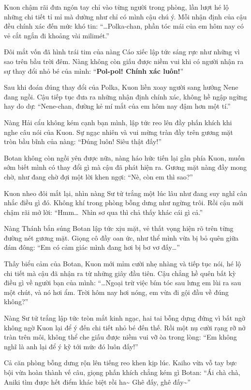 \documentclass[../main.tex]{subfiles}
\begin{document}
Kuon chậm rãi đưa ngón tay chỉ vào từng người trong phòng, lần lượt hé lộ những chi tiết tỉ mỉ mà dường như chỉ có mình cậu chú ý. Mỗi nhận định của cậu đều chính xác đến mức khó tin: ``\dots Polka-chan, phần tóc mái của em hôm nay có vẻ cắt ngắn đi khoảng vài milimét.''

Đôi mắt vốn đã hình trái tim của nàng Cáo xiếc lập tức sáng rực như những vì sao trên bầu trời đêm. Nàng không còn giấu được niềm vui khi có người nhận ra sự thay đổi nhỏ bé của mình: ``\textbf{Pol-pol! Chính xác luôn!}''

Sau khi đoán đúng thay đổi của Polka, Kuon liền xoay người sang hướng Nene đang ngồi. Cậu tiếp tục đưa ra những nhận định chính xác, không hề ngập ngừng hay do dự: ``Nene-chan, đường kẻ mí mắt của em hôm nay đậm hơn một tí.''

Nàng Hải cẩu không kém cạnh bạn mình, lập tức reo lên đầy phấn khích khi nghe câu nói của Kuon. Sự ngạc nhiên và vui mừng tràn đầy trên gương mặt tròn bầu bĩnh của nàng: ``Đúng luôn! Siêu thật đấy!''

Botan không còn ngồi yên được nữa, nàng háo hức tiến lại gần phía Kuon, muốn sớm biết mình có thay đổi gì mà cậu đã phát hiện ra. Gương mặt nàng đầy mong chờ, như đang chờ đợi một lời khen ngợi: ``Nè, còn em thì sao?''

Kuon nheo đôi mắt lại, nhìn nàng Sư tử trắng một lúc lâu như đang suy nghĩ cân nhắc điều gì đó. Không khí trong phòng bỗng dưng như ngừng trôi. Rồi cậu mới chậm rãi mở lời: ``Hmm\dots\ Nhìn sơ qua thì chả thấy khác cái gì cả.''

Nàng Thánh bắn súng Botan lập tức xịu mặt, vẻ thất vọng hiện rõ trên từng đường nét gương mặt. Giọng cô đầy oan ức, như thể mình vừa bị bỏ quên giữa đám đông: ``Em có cảm giác mình đang hơi bị bơ vơ đấy\dots''

Thấy biểu cảm của Botan, Kuon mới mỉm cười nhẹ nhàng và tiếp tục nói, hé lộ chi tiết mà cậu đã nhận ra từ những giây đầu tiên. Cậu chẳng hề quên bất kỳ điều gì về người bạn của mình: ``\dots Ngoại trừ việc bím tóc sau lưng em lùi ra sau một chút, và nó hơi ẩm. Trời hôm nay hơi nóng, em vừa đi gội đầu về đúng không?''

Nàng Sư tử trắng lập tức tròn mắt kinh ngạc, hai tai bỗng dựng đứng vì bất ngờ không ngờ Kuon lại để ý đến chi tiết nhỏ bé đến thế. Rồi một nụ cười rạng rỡ nở tràn trên môi, không thể che giấu được niềm vui vỡ òa trong lòng: ``Em không nghĩ là anh lại để ý kỹ tới mức đó luôn đấy!''

Cả căn phòng bỗng dưng rộn lên tiếng reo khen kịp lúc. Kaiho vừa vỗ tay bực bội vừa hoàn thành vế câu, giọng phấn khích chẳng kém gì Botan: ``Ái chà chà, Aniki tìm được hết điểm khác biệt rồi ha\~{} Ghê đấy, ghê đấy\~{}''
\end{document}
